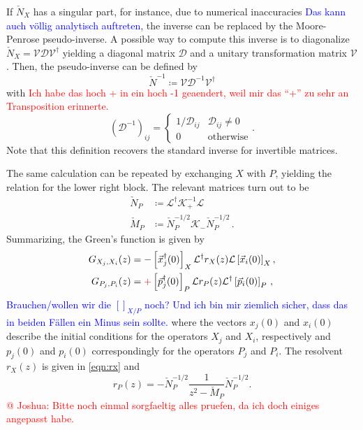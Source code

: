 \documentclass[
    reprint, 
    aps,
    preprintnumbers,
    twocolumn,
    prb,
    superscriptaddress
]{revtex4-2}
\newcommand{\bs}{\begin{subequations}}
\newcommand{\es}{\end{subequations}}
\newcommand{\red}[1]{\textcolor{red}{#1}}
\newcommand{\blue}[1]{\textcolor{blue}{#1}}
\begin{document}
If $\check{N}_X$ has a singular part, for instance, due to numerical inaccuracies \blue{Das kann auch völlig analytisch auftreten}, the inverse can be replaced by the Moore-Penrose pseudo-inverse. 
A possible way to compute this inverse is to diagonalize 
$\check{N}_X = \mathcal{V} \mathcal{D} \mathcal{V}^\dagger$ yielding a diagonal matrix $\mathcal{D}$ and a unitary transformation matrix $\mathcal{V}$. 
Then, the pseudo-inverse can be defined by
\begin{equation}
    \check{N}^{-1} \coloneqq \mathcal{V} \mathcal{D}^{-1} \mathcal{V}^\dagger
\end{equation}
with \red{Ich habe das hoch + in ein hoch -1 geaendert, weil mir das "`+"' zu sehr an Transposition erinnerte.}
\begin{equation}
    (\mathcal{D}^{-1})_{ij} = \begin{cases}
        1/\mathcal{D}_{ij} & \mathcal{D}_{ij} \neq 0 \\ 0 & \text{otherwise}
    \end{cases}.
\end{equation}
Note that this definition recovers the standard inverse for invertible matrices.

The same calculation can be repeated by exchanging $X$ with $P$, yielding the relation for the lower right block.
The relevant matrices turn out to be 
\bs
\begin{align}
    \check{N}_P &\coloneqq \mathcal{L}^\dagger \mathcal{K}_+^{-1} \mathcal{L}
		\\
		\check{M}_P &\coloneqq \check{N}_P^{-1/2} \mathcal{K}_- \check{N}_P^{-1/2}\,.
\end{align}
\es
Summarizing, the Green's function is given by
\begin{subequations}
    \begin{align}
        G_{X_j,X_i}  (z) &= - \left[ \vec{x}_j^\dagger (0) \right]_X \mathcal{L}^\dagger r_X (z) \mathcal{L} \left[ \vec{x}_i(0) \right]_X, 
				\\
        G_{P_j,P_i} (z) &= \red{+} \left[ \vec{p}_j^\dagger (0) \right]_P \mathcal{L} r_P (z) \mathcal{L}^\dagger \left[ \vec{p}_i(0) \right]_P\,,
    \end{align}
\end{subequations}
\blue{Brauchen/wollen wir die $[]_{X/P}$ noch? Und ich bin mir ziemlich sicher, dass das in beiden Fällen ein Minus sein sollte.}
where the vectors $x_j(0)$ and $x_i(0)$ describe the initial conditions for the operators
$X_j$ and $X_i$, respectively and $p_j(0)$ and $p_i(0)$ correspondingly for the operators
$P_j$ and $P_i$. The resolvent $r_X (z)$ is given in \eqref{eqn:rx} and 
\begin{equation}
    r_P (z) = -\check{N}_P^{-1/2} \frac{1}{z^2 - \check{M}_P} \check{N}_P^{-1/2} .
\end{equation}
\red{@ Joshua: Bitte noch einmal sorgfaeltig alles pruefen, da ich doch einiges angepasst habe.}
\end{document}

